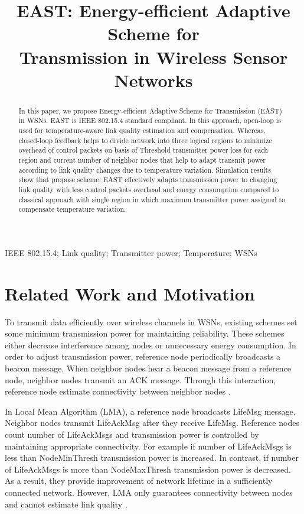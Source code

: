 \documentclass{article}
\title{EAST: Energy-efficient Adaptive Scheme for \\Transmission in Wireless Sensor Networks}
\begin{document}
\maketitle
\begin{abstract}
In this paper, we propose Energy-efficient Adaptive Scheme for Transmission (EAST) in WSNs. EAST is IEEE 802.15.4 standard compliant. In this approach, open-loop is used for temperature-aware link quality estimation and compensation. Whereas, closed-loop feedback helps to divide network into three logical regions to minimize overhead of control packets on basis of Threshold transmitter power loss  for each region and current number of neighbor nodes that help to adapt transmit power according to link quality changes due to temperature variation. Simulation results show that propose scheme; EAST effectively adapts transmission power to changing link quality with less control packets overhead and energy consumption compared to classical approach with single region in which maximum transmitter power assigned to compensate temperature variation.
\end{abstract}
\begin{keywords}
IEEE 802.15.4; Link quality; Transmitter power; Temperature; WSNs
\end{keywords}

\section{Related Work and Motivation}
\label{sec:format}

To transmit data efficiently over wireless channels in WSNs, existing schemes set some minimum transmission power for maintaining reliability. These schemes either decrease interference among nodes or unnecessary energy consumption. In order to adjust transmission power, reference node periodically broadcasts a beacon message. When neighbor nodes hear a beacon message from a reference node, neighbor nodes transmit an ACK message. Through this interaction, reference node estimate connectivity between neighbor nodes \cite{1}.


In Local Mean Algorithm (LMA), a reference node broadcasts LifeMsg message. Neighbor nodes transmit LifeAckMsg after they receive LifeMsg. Reference nodes count number of LifeAckMsgs and transmission power is controlled by maintaining appropriate connectivity. For example if number of LifeAckMsgs is less than NodeMinThresh transmission power is increased. In contrast, if number of LifeAckMsgs is more than NodeMaxThresh transmission power is decreased. As a result, they provide improvement of network lifetime in a sufficiently connected network. However, LMA only guarantees connectivity between nodes and cannot estimate link quality \cite{2}.
\end{document}
